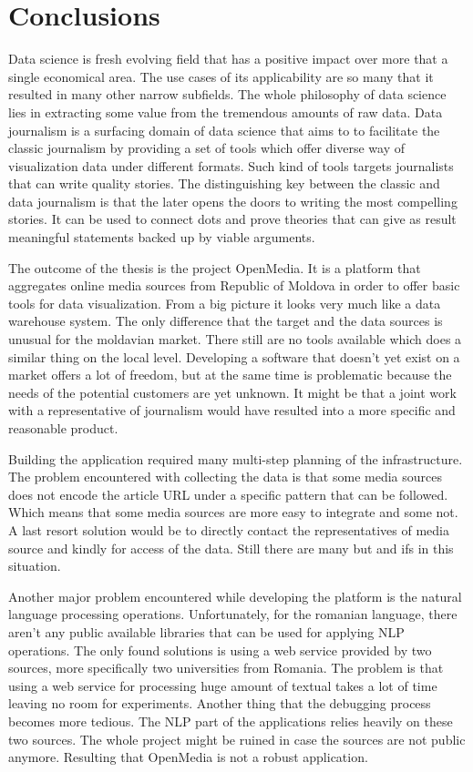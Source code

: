 \section*{Conclusions}
Data science is fresh evolving field that has a positive impact over more that a single economical area. The use cases of its applicability are so many that it resulted in many other narrow subfields. The whole philosophy of data science lies in extracting some value from the tremendous amounts of raw data. Data journalism is a surfacing domain of data science that aims to to facilitate the classic journalism by providing a set of tools which offer diverse way of visualization data under different formats. Such kind of tools targets journalists that can write quality stories. The distinguishing key between the classic and data journalism is that the later opens the doors to writing the most compelling stories. It can be used to connect dots and prove theories that can give as result meaningful statements backed up by viable arguments.

The outcome of the thesis is the project OpenMedia. It is a platform that aggregates online media sources from Republic of Moldova in order to offer basic tools for data visualization. From a big picture it looks very much like a data warehouse system. The only difference that the target and the data sources is unusual for the moldavian market. There still are no tools available which does a similar thing on the local level. Developing a software that doesn't yet exist on a market offers a lot of freedom, but at the same time is problematic because the needs of the potential customers are yet unknown. It might be that a joint work with a representative of journalism would have resulted into a more specific and reasonable product.

Building the application required many multi-step planning of the infrastructure. The problem encountered with collecting the data is that some media sources does not encode the article URL under a specific pattern that can be followed. Which means that some media sources are more easy to integrate and some not. A last resort solution would be to directly contact the representatives of media source and kindly for access of the data. Still there are many but and ifs in this situation.

Another major problem encountered while developing the platform is the natural language processing operations. Unfortunately, for the romanian language, there aren't any public available libraries that can be used for applying NLP operations. The only found solutions is using a web service provided by two sources, more specifically two universities from Romania. The problem is that using a web service for processing huge amount of textual takes a lot of time leaving no room for experiments. Another thing that the debugging process becomes more tedious. The NLP part of the applications relies heavily on these two sources. The whole project might be ruined in case the sources are not public anymore. Resulting that OpenMedia is not a robust application.


